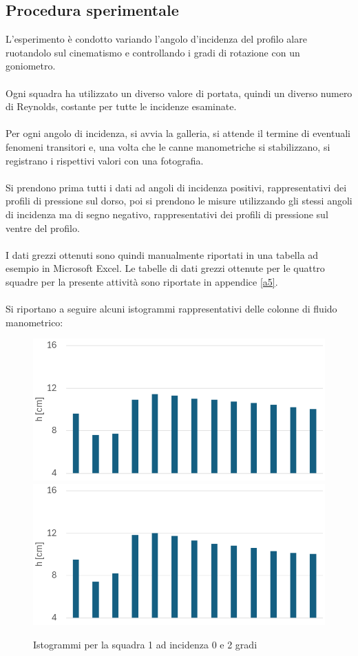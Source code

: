 \subsection{Procedura sperimentale}
L'esperimento è condotto variando l'angolo d'incidenza del profilo alare ruotandolo sul cinematismo e controllando i gradi di rotazione con un goniometro.\\\\
Ogni squadra ha utilizzato un diverso valore di portata, quindi un diverso numero di Reynolds, costante per tutte le incidenze esaminate.\\\\
Per ogni angolo di incidenza, si avvia la galleria, si attende il termine di eventuali fenomeni transitori e, una volta che le canne manometriche si stabilizzano, si registrano i rispettivi valori con una fotografia.\\\\
Si prendono prima tutti i dati ad angoli di incidenza positivi, rappresentativi dei profili di pressione sul dorso, poi si prendono le misure utilizzando gli stessi angoli di incidenza ma di segno negativo, rappresentativi dei profili di pressione sul ventre del profilo.\\\\
I dati grezzi ottenuti sono quindi manualmente riportati in una tabella ad esempio in Microsoft Excel. Le tabelle di dati grezzi ottenute per le quattro squadre per la presente attività sono riportate in appendice \ref{a5}.\\\\
Si riportano a seguire alcuni istogrammi rappresentativi delle colonne di fluido manometrico:
\begin{figure}[H]
    \centering
    \includegraphics[width=.49\textwidth]{images/5/dsq1a0.png}
    \includegraphics[width=.49\textwidth]{images/5/dsq1a2.png}
    \caption{Istogrammi per la squadra 1 ad incidenza 0 e 2 gradi}
\end{figure}

